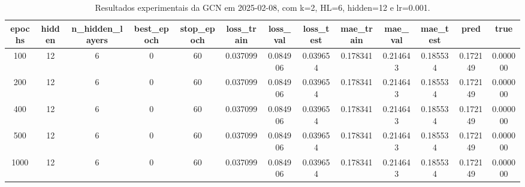 \begin{table}[h]
\centering
\caption{Resultados experimentais da GCN em 2025-02-08, com k=2, HL=6, hidden=12 e lr=0.001.}
\label{tab:gcn_results_k2_hl6_h12_d20250208}
\begin{tabular}{ccccccccccccc}
\toprule
epochs & hidden & n\_hidden\_layers & best\_epoch & stop\_epoch & loss\_train & loss\_val & loss\_test & mae\_train & mae\_val & mae\_test & pred & true \\
\midrule
100 & 12 & 6 & 0 & 60 & 0.037099 & 0.084906 & 0.039654 & 0.178341 & 0.214643 & 0.185534 & 0.172149 & 0.000000 \\
200 & 12 & 6 & 0 & 60 & 0.037099 & 0.084906 & 0.039654 & 0.178341 & 0.214643 & 0.185534 & 0.172149 & 0.000000 \\
400 & 12 & 6 & 0 & 60 & 0.037099 & 0.084906 & 0.039654 & 0.178341 & 0.214643 & 0.185534 & 0.172149 & 0.000000 \\
500 & 12 & 6 & 0 & 60 & 0.037099 & 0.084906 & 0.039654 & 0.178341 & 0.214643 & 0.185534 & 0.172149 & 0.000000 \\
1000 & 12 & 6 & 0 & 60 & 0.037099 & 0.084906 & 0.039654 & 0.178341 & 0.214643 & 0.185534 & 0.172149 & 0.000000 \\
\bottomrule
\end{tabular}
\end{table}
